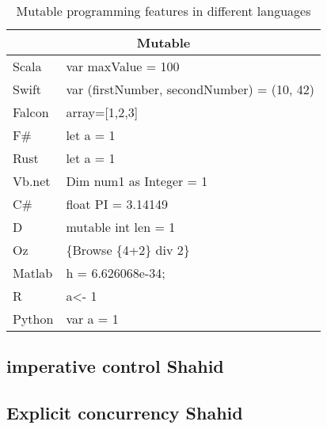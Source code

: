 \documentclass{sig-alternate}
\begin{document}
\begin{table}[]
\centering
\caption{Mutable programming features in different languages}
\label{my-label}
\begin{tabular}{|l|l|}
\hline
\multicolumn{2}{|c|}{Mutable}                     \\ \hline
Scala  & var maxValue = 100                         \\ \hline
Swift  & var (firstNumber, secondNumber) = (10, 42) \\ \hline
Falcon & array={[}1,2,3{]}                          \\ \hline
F\#    & let a = 1                                  \\ \hline
Rust   & let a = 1                                  \\ \hline
Vb.net & Dim num1  as Integer = 1                   \\ \hline
C\#    & float PI = 3.14149                         \\ \hline
D      & mutable int len = 1                        \\ \hline
Oz     & \{Browse \{4+2\} div 2\}                   \\ \hline
Matlab & h = 6.626068e-34;                          \\ \hline
R      & a\textless{}- 1                            \\ \hline
Python & var a = 1                                  \\ \hline
\end{tabular}
\end{table}

\subsection{imperative control Shahid}
\subsection{Explicit concurrency Shahid}
\end{document}
